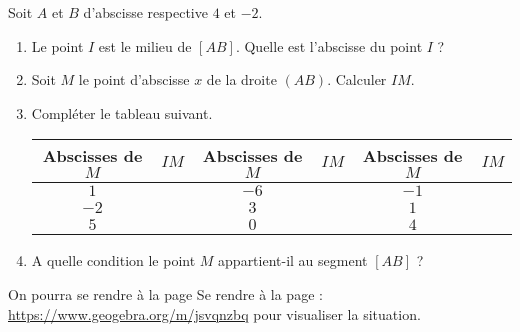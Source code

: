  
Soit $A$ et $B$ d'abscisse respective $4$ et $-2$.

\begin{enumerate}
\item Le point $I$ est le milieu de $[AB]$. Quelle est l'abscisse du point $I$ ? 
\item Soit $M$ le point d'abscisse $x$ de la droite $(AB)$. Calculer $IM$. 
\item Compléter le tableau suivant.

\begin{tabular}{|c|p{1.5cm}|c|p{1.5cm}|c|p{1.5cm}|}
\hline 
Abscisses de $M$ & $IM$ & Abscisses de $M$ & $IM$ & Abscisses de $M$ & $IM$ \\ 
\hline 
$1$ & & $-6$ &  & $-1$ & \\ 
\hline 
$-2$ & & $3$ &  & $1$ & \\ 
\hline 
$5$ & & $0$ &  & $4$ & \\ 
\hline 
\end{tabular}

\item  A quelle condition le point $M$ appartient-il au segment $[AB]$ ?

\end{enumerate}

On pourra se rendre à la page Se rendre à la page : \url{https://www.geogebra.org/m/jsvqnzbq} pour visualiser la situation.